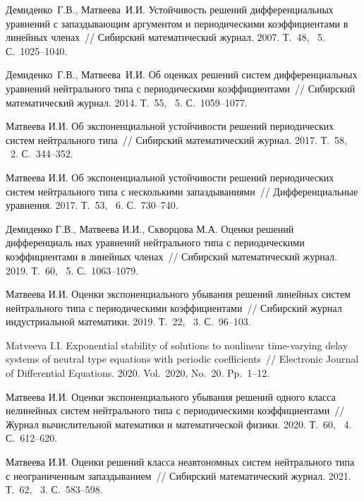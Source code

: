 \begin{thebibliography}{9} %
Демиденко~Г.В., Матвеева~И.И.
Устойчивость решений дифференциальных уравнений с запаздывающим аргументом и 
периодическими коэффициентами в линейных членах~//
Сибирский математический журнал. 2007. Т.~48, \textnumero~5. С.~1025--1040.

Демиденко~Г.В., Матвеева~И.И.
Об оценках решений систем дифференциальных уравнений нейтрального типа 
с периодическими коэффициентами~//
Сибирский математический журнал. 2014. Т.~55, \textnumero~5. С.~1059--1077.

Матвеева И.И.
Об экспоненциальной устойчивости решений периодических систем нейтрального типа~//
Сибирский математический журнал. 2017. Т.~58, \textnumero~2. С.~344--352.

Матвеева И.И.
Об экспоненциальной устойчивости решений периодических систем нейтрального 
типа с несколькими запаздываниями~//
Дифференциальные уравнения. 2017. Т.~53, \textnumero~6. С.~730--740.

Демиденко Г.В., Матвеева И.И., Скворцова М.А.
Оценки решений дифференциаль
ных уравнений нейтрального типа с периодическими 
коэффициентами в линейных членах~//
Сибирский математический журнал. 2019. Т.~60, \textnumero~5. С.~1063--1079.

Матвеева И.И.
Оценки экспоненциального убывания решений линейных систем нейтрального типа 
с периодическими коэффициентами~//
Сибирский журнал индустриальной математики. 2019. Т.~22, \textnumero~3. С.~96--103.

Matveeva I.I.
Exponential stability of solutions to nonlinear time-varying
delay systems of neutral type equations with periodic coefficients~//
Electronic Journal of Differential Equations. 2020. Vol.~2020, No.~20. Pp.~1--12.

Матвеева И.И.
Оценки экспоненциального убывания решений одного класса 
нелинейных систем нейтрального типа с периодическими коэффициентами~//
Журнал вычислительной математики и математической физики.
2020. Т.~60, \textnumero~4. С.~612--620.

Матвеева И.И.
Оценки решений класса неавтономных систем нейтрального типа с неограниченным запаздыванием~//
Сибирский математический журнал. 2021. Т.~62, \textnumero~3. С.~583--598.

\end{thebibliography}




%

